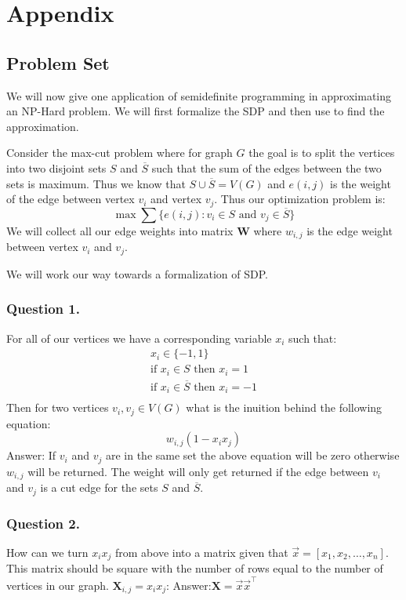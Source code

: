 \documentclass{article}
\begin{document}
\newpage
\section{Appendix}
\subsection{Problem Set}
We will now give one application of semidefinite programming in approximating an NP-Hard problem.
We will first formalize the SDP and then use to find the approximation.

Consider the max-cut problem where for graph \( G \) the goal is to split the vertices into two disjoint sets \( S \) and \( \overline{S} \) such that the sum of the edges between the two sets is maximum.
Thus we know that \( S \cup \overline{S} = V(G) \) and \( e(i, j) \) is the weight of the edge between vertex \( v_i \) and vertex \( v_j \).
Thus our optimization problem is:
\[
  \max \sum \{ e(i, j): v_i \in S \text{ and } v_j \in \overline{S} \}
\]
We will collect all our edge weights into matrix \( \mathbf{W} \) where \( w_{i, j} \) is the edge weight between vertex \( v_i \) and \( v_j \).

We will work our way towards a formalization of SDP.
\subsubsection{Question 1.}
For all of our vertices we have a corresponding variable \( x_i \) such that:
\begin{gather*}
x_i \in \{ -1, 1 \} \\
\text{if } x_i \in S \text{ then } x_i = 1 \\
\text{if } x_i \in \overline{S} \text{ then } x_i = -1 \\
\end{gather*}
Then for two vertices \( v_i, v_j \in V(G) \) what is the inuition behind the following equation:
\[
w_{i, j}(1 - x_i x_j)
\]
Answer: If \( v_i \) and \( v_j \) are in the same set the above equation will be zero otherwise \( w_{i, j} \) will be returned. The weight will only get returned if the edge between \( v_i \) and \( v_j \) is a cut edge for the sets \( S \) and \( \overline{S} \).

\subsubsection{Question 2.}
How can we turn \( x_i x_j \) from above into a matrix given that \( \vec{x} = [x_1, x_2, \ldots, x_n] \). This matrix should be square with the number of rows equal to the number of vertices in our graph. \( \mathbf{X}_{i, j} = x_i x_j \):
Answer:\( \mathbf{X} = \vec{x} \vec{x}^\top \)
\end{document}

